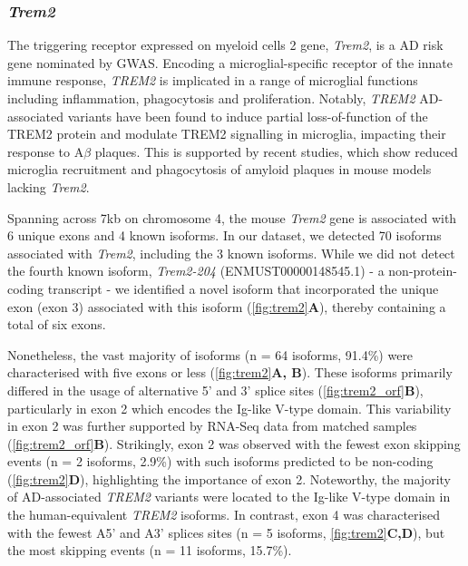 \newpage
\subsubsection{\textit{Trem2}}
\label{ch5: trem2_annotation}
The triggering receptor expressed on myeloid cells 2 gene, \textit{Trem2}, is a AD risk gene nominated by GWAS. Encoding a microglial-specific receptor of the innate immune response, \textit{TREM2} is implicated in a range of microglial functions including inflammation, phagocytosis and proliferation. Notably, \textit{TREM2} AD-associated variants have been found to induce partial loss-of-function of the TREM2 protein and modulate TREM2 signalling in microglia, impacting their response to A$\beta$ plaques\cite{Kober2016, Guerreiro2013a}. This is supported by recent studies, which show reduced microglia recruitment and phagocytosis of amyloid plaques in mouse models lacking \textit{Trem2}\cite{Wang2015a}. 

Spanning across 7kb on chromosome 4, the mouse \textit{Trem2} gene is associated with 6 unique exons and 4 known isoforms. In our dataset, we detected 70 isoforms associated with \textit{Trem2}, including the 3 known isoforms. While we did not detect the fourth known isoform, \textit{Trem2-204} (ENMUST00000148545.1) - a non-protein-coding transcript - we identified a novel isoform that incorporated the unique exon (exon 3) associated with this isoform (\cref{fig:trem2}\textbf{A}), thereby containing a total of six exons.   

Nonetheless, the vast majority of isoforms (n = 64 isoforms, 91.4\%) were characterised with five exons or less (\cref{fig:trem2}\textbf{A, B}). These isoforms primarily differed in the usage of alternative 5' and 3' splice sites (\cref{fig:trem2_orf}\textbf{B}), particularly in exon 2 which encodes the Ig-like V-type domain. This variability in exon 2 was further supported by RNA-Seq data from matched samples (\cref{fig:trem2_orf}\textbf{B}). Strikingly, exon 2 was observed with the fewest exon skipping events (n = 2 isoforms, 2.9\%) with such isoforms predicted to be non-coding (\cref{fig:trem2}\textbf{D}), highlighting the importance of exon 2. Noteworthy, the majority of AD-associated \textit{TREM2} variants were located to the Ig-like V-type domain in the human-equivalent \textit{TREM2} isoforms. In contrast, exon 4 was characterised with the fewest A5' and A3' splices sites (n = 5 isoforms, \cref{fig:trem2}\textbf{C,D}), but the most skipping events (n = 11 isoforms, 15.7\%). 

